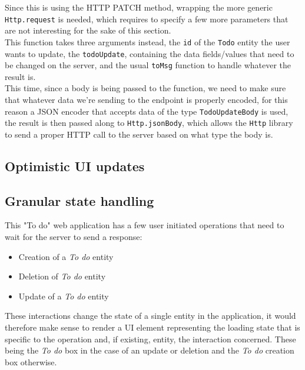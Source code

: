 \begin{sloppypar}
Since this is using the HTTP PATCH method, wrapping the more generic \texttt{Http.request} is needed, which requires to specify a few more parameters that are not interesting for the sake of this section.\\
This function takes three arguments instead, the \texttt{id} of the \texttt{Todo} entity the user wants to update, the \texttt{todoUpdate}, containing the data fields/values that need to be changed on the server, and the usual \texttt{toMsg} function to handle whatever the result is.\\
This time, since a body is being passed to the function, we need to make sure that whatever data we're sending to the endpoint is properly encoded, for this reason a JSON encoder that accepts data of the type \texttt{TodoUpdateBody} is used, the result is then passed along to \texttt{Http.jsonBody}, which allows the \texttt{Http} library to send a proper HTTP call to the server based on what type the body is.
\end{sloppypar}

\subsection{Optimistic UI updates}

\subsection{Granular state handling}
This "To do" web application has a few user initiated operations that need to wait for the server to send a response:
\begin{itemize}
    \item Creation of a \textit{To do} entity
    \item Deletion of \textit{To do} entity
    \item Update of a \textit{To do} entity
\end{itemize}
These interactions change the state of a single entity in the application, it would therefore make sense to render a UI element representing the loading state that is specific to the operation and, if existing, entity, the interaction concerned. These being the \textit{To do} box in the case of an update or deletion and the \textit{To do} creation box otherwise.\\


